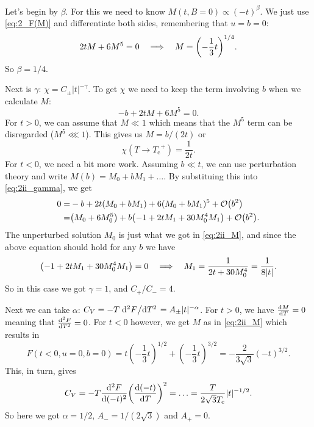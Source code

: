 \documentclass[11pt,letter, swedish, english
]{article}
\newcommand{\Tc}{\ensuremath{T_{\text{c}}}}
\begin{document}
Let's begin by $\beta$. For this we need to know
$M(t,B=0)\propto(-t)^\beta$. We just use \eqref{eq:2_F(M)} and
differentiate both sides, remembering that $u=b=0$:
\begin{equation}\label{eq:2ii_M}
2tM+6M^5=0\quad\Longrightarrow\quad
M=\qty(-\frac{1}{3}t)^{1/4}.
\end{equation}
So $\beta=1/4$.

Next is $\gamma$: $\chi=C_\pm|t|^{-\gamma}$. To get $\chi$ we need to
keep the term involving $b$ when we calculate $M$:
\begin{equation}\label{eq:2ii_gamma}
-b+2tM+6M^5=0.
\end{equation}
For $t>0$, we can assume that $M\ll1$ which means that the $M^5$ term
can be disregarded ($M^5\lll1$). This gives us $M=b/(2t)$ or
\begin{equation}
\chi(T\to\Tc^+)=\frac{1}{2t}.
\end{equation}
For $t<0$, we need a bit more work.
Assuming $b\ll t$, we can use perturbation theory and write
$M(b)=M_0+bM_1+\ldots$. By substituing this into \eqref{eq:2ii_gamma},
we get
\begin{equation}
\begin{aligned}
0=&-b+2t(M_0+bM_1)+6(M_0+bM_1)^5+\order{b^2}\\
=& \qty(M_0+6M_0^5)+b\qty(-1+2tM_1+30M_0^4M_1) +\order{b^2}.
\end{aligned}
\end{equation}
The unperturbed solution $M_0$ is just what we got in
\eqref{eq:2ii_M}, and since the above equation should hold for any
$b$ we have
\begin{equation}
\qty(-1+2tM_1+30M_0^4M_1)=0 \quad\Longrightarrow\quad
M_1=\frac{1}{2t+30M_0^4}=\frac{1}{8|t|}.
\end{equation}
So in this case we got $\gamma=1$, and $C_+/C_-=4$.

Next we can take $\alpha$:
$C_V=-T\dv*[2]{F}{T}=A_\pm|t|^{-\alpha}$. For $t>0$, we have $\dv{M}{T}=0$
meaning that $\dv[2]{F}{T}=0$. For $t<0$ however, we get $M$ as in
\eqref{eq:2ii_M} which results in
\begin{equation}
F(t<0, u=0, b=0)=t(-\frac{1}{3}t)^{1/2}+(-\frac{1}{3}t)^{3/2}
=-\frac{2}{3\sqrt{3}}(-t)^{3/2}.
\end{equation}
This, in turn, gives
\begin{equation}
C_V=-T\dv[2]{F}{(-t)}\qty(\dv{(-t)}{T})^2=\ldots
=\frac{T}{2\sqrt{3}\Tc}|t|^{-1/2}.
\end{equation}
So here we got $\alpha=1/2$, $A_-=1/(2\sqrt{3})$ and $A_+=0$.
\end{document}
